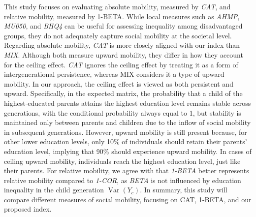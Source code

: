 This study focuses on evaluating absolute mobility, measured by \textit{CAT}, and relative mobility, measured by 1-BETA. While local measures such as \textit{AHMP}, \textit{MU050}, and \textit{BHQ4} can be useful for assessing inequality among disadvantaged groups, they do not adequately capture social mobility at the societal level. Regarding absolute mobility, \textit{CAT} is more closely aligned with our index than \textit{MIX}. Although both measure upward mobility, they differ in how they account for the ceiling effect. \textit{CAT} ignores the ceiling effect by treating it as a form of intergenerational persistence, whereas MIX considers it a type of upward mobility. In our approach, the ceiling effect is viewed as both persistent and upward. Specifically, in the expected matrix, the probability that a child of the highest-educated parents attains the highest education level remains stable across generations, with the conditional probability always equal to 1, but stability is maintained only between parents and children due to the inflow of social mobility in subsequent generations. However, upward mobility is still present because, for other lower education levels, only 10\% of individuals should retain their parents' education level, implying that 90\% should experience upward mobility. In cases of ceiling upward mobility, individuals reach the highest education level, just like their parents. For relative mobility, we agree with \citet{van2024intergenerational} that \textit{1-BETA} better represents relative mobility compared to \textit{1-COR}, as \textit{BETA} is not influenced by education inequality in the child generation $\operatorname{Var}(Y_c)$. In summary, this study will compare different measures of social mobility, focusing on CAT, 1-BETA, and our proposed index.

